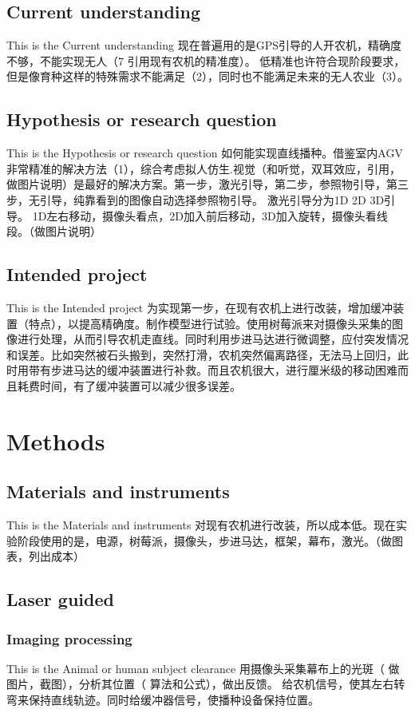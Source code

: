 \documentclass[12pt]{article}
\begin{document}
\begin{flushleft}
\subsection{Current understanding}
This is the Current understanding
现在普遍用的是GPS引导的人开农机，精确度不够，不能实现无人（7 引用现有农机的精准度）。
低精准也许符合现阶段要求，但是像育种这样的特殊需求不能满足（2），同时也不能满足未来的无人农业（3）。

\subsection{Hypothesis or research question}
This is the Hypothesis or research question
如何能实现直线播种。借鉴室内AGV非常精准的解决方法（1），综合考虑拟人仿生.视觉（和听觉，双耳效应，引用，做图片说明）是最好的解决方案。第一步，激光引导，第二步，参照物引导，第三步，无引导，纯靠看到的图像自动选择参照物引导。
激光引导分为1D 2D 3D引导。 1D左右移动，摄像头看点，2D加入前后移动，3D加入旋转，摄像头看线段。（做图片说明）

\subsection{Intended project}
This is the Intended project
为实现第一步，在现有农机上进行改装，增加缓冲装置（特点），以提高精确度。制作模型进行试验。使用树莓派来对摄像头采集的图像进行处理，从而引导农机走直线。同时利用步进马达进行微调整，应付突发情况和误差。比如突然被石头搬到，突然打滑，农机突然偏离路径，无法马上回归，此时用带有步进马达的缓冲装置进行补救。而且农机很大，进行厘米级的移动困难而且耗费时间，有了缓冲装置可以减少很多误差。

\section{Methods}

\subsection{Materials and instruments}
This is the Materials and instruments
对现有农机进行改装，所以成本低。现在实验阶段使用的是，电源，树莓派，摄像头，步进马达，框架，幕布，激光。（做图表，列出成本）

\subsection{Laser guided}

\subsubsection{Imaging processing}
This is the Animal or human subject clearance
用摄像头采集幕布上的光斑（ 做图片，截图），分析其位置（ 算法和公式），做出反馈。 给农机信号，使其左右转弯来保持直线轨迹。同时给缓冲器信号，使播种设备保持位置。


\end{flushleft}
\end{document}

